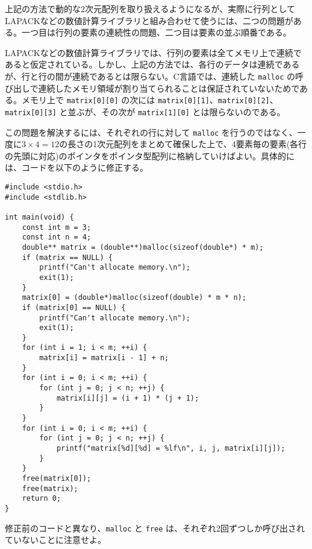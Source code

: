 上記の方法で動的な2次元配列を取り扱えるようになるが、実際に行列としてLAPACKなどの数値計算ライブラリと組み合わせて使うには、二つの問題がある。一つ目は行列の要素の連続性の問題、二つ目は要素の並ぶ順番である。

LAPACKなどの数値計算ライブラリでは、行列の要素は全てメモリ上で連続であると仮定されている。しかし、上記の方法では、各行のデータは連続であるが、行と行の間が連続であるとは限らない。C言語では、連続した \texttt{malloc} の呼び出しで連続したメモリ領域が割り当てられることは保証されていないためである。メモリ上で \texttt{matrix[0][0]} の次には \texttt{matrix[0][1]}、\texttt{matrix[0][2]}、\texttt{matrix[0][3]} と並ぶが、その次が \texttt{matrix[1][0]} とは限らないのである。

この問題を解決するには、それぞれの行に対して \texttt{malloc} を行うのではなく、一度に\(3 \times 4 = 12\)の長さの1次元配列をまとめて確保した上で、4要素毎の要素(各行の先頭に対応)のポインタをポインタ型配列に格納していけばよい。具体的には、コードを以下のように修正する。
\begin{reidai}\label{ex:malloc-2dim-continuous}
    \begin{verbatim}
#include <stdio.h>
#include <stdlib.h>

int main(void) {
    const int m = 3;
    const int n = 4;
    double** matrix = (double**)malloc(sizeof(double*) * m);
    if (matrix == NULL) {
        printf("Can't allocate memory.\n");
        exit(1);
    }
    matrix[0] = (double*)malloc(sizeof(double) * m * n);
    if (matrix[0] == NULL) {
        printf("Can't allocate memory.\n");
        exit(1);
    }
    for (int i = 1; i < m; ++i) {
        matrix[i] = matrix[i - 1] + n;
    }
    for (int i = 0; i < m; ++i) {
        for (int j = 0; j < n; ++j) {
            matrix[i][j] = (i + 1) * (j + 1);
        }
    }
    for (int i = 0; i < m; ++i) {
        for (int j = 0; j < n; ++j) {
            printf("matrix[%d][%d] = %lf\n", i, j, matrix[i][j]);
        }
    }
    free(matrix[0]);
    free(matrix);
    return 0;
}
\end{verbatim}
\end{reidai} \noindent
修正前のコードと異なり、\texttt{malloc} と \texttt{free} は、それぞれ2回ずつしか呼び出されていないことに注意せよ。


